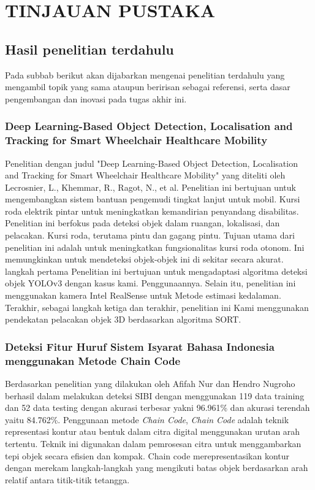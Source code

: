 \chapter{TINJAUAN PUSTAKA}

\section{Hasil penelitian terdahulu}
Pada subbab berikut akan dijabarkan mengenai penelitian terdahulu yang mengambil topik yang sama ataupun beririsan sebagai referensi, serta dasar pengembangan dan inovasi pada tugas akhir ini.
\subsection{Deep Learning-Based Object Detection, Localisation and Tracking
for Smart Wheelchair Healthcare Mobility} Penelitian dengan judul "Deep Learning-Based Object Detection, Localisation and Tracking for Smart Wheelchair Healthcare Mobility" yang diteliti oleh Lecrosnier, L., Khemmar, R., Ragot, N., et al.
Penelitian ini bertujuan untuk mengembangkan sistem bantuan pengemudi tingkat lanjut untuk mobil. Kursi roda elektrik pintar untuk meningkatkan kemandirian penyandang disabilitas. Penelitian ini berfokus pada deteksi objek dalam ruangan, lokalisasi, dan pelacakan.
Kursi roda, terutama pintu dan gagang pintu.
Tujuan utama dari penelitian ini adalah untuk meningkatkan fungsionalitas kursi roda otonom. Ini memungkinkan untuk mendeteksi objek-objek ini di sekitar secara akurat. langkah pertama Penelitian ini bertujuan untuk mengadaptasi algoritma deteksi objek YOLOv3 dengan kasus kami. Penggunaannya. Selain itu, penelitian ini menggunakan kamera Intel RealSense untuk Metode estimasi kedalaman. Terakhir, sebagai langkah ketiga dan terakhir, penelitian ini Kami menggunakan pendekatan pelacakan objek 3D berdasarkan algoritma SORT. \cite{Lecrosnier2021}

\subsection{Deteksi Fitur Huruf Sistem Isyarat Bahasa Indonesia menggunakan Metode Chain Code}
Berdasarkan penelitian yang dilakukan oleh Afifah Nur dan Hendro Nugroho berhasil dalam melakukan deteksi SIBI dengan menggunakan 119 data training dan 52 data testing dengan akurasi terbesar yakni 96.961\% dan akurasi terendah yaitu 84.762\%. Penggunaan metode \emph{Chain Code}, \emph{Chain Code} adalah teknik representasi kontur atau bentuk dalam citra digital menggunakan urutan arah tertentu. Teknik ini digunakan dalam pemrosesan citra untuk menggambarkan tepi objek secara efisien dan kompak. Chain code merepresentasikan kontur dengan merekam langkah-langkah yang mengikuti batas objek berdasarkan arah relatif antara titik-titik tetangga. \cite{Afifah2022}

